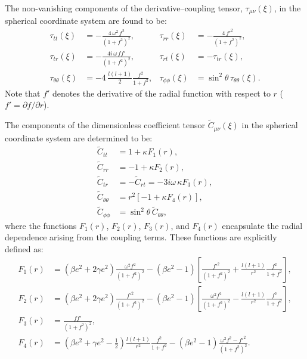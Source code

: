 \documentclass[aps,prd,superscriptaddress,notitlepage,11pt,final,longbibliography,nofootinbib]{revtex4-1}
\numberwithin{equation}{section}
\begin{document}
The non-vanishing components of the derivative--coupling tensor, $\tau_{\mu\nu}(\xi)$, in the spherical coordinate system are found to be:
\begin{align}
\tau_{tt}(\xi)&=-\frac{4\,\omega^2\,f^2}{(1+f^2)^2},
&\tau_{rr}(\xi)&=-\frac{4\,f'^2}{(1+f^2)^2},\nonumber\\
\tau_{tr}(\xi)&=-\frac{4i\,\omega\,ff'}{(1+f^2)^2},
&\tau_{rt}(\xi)&=-\tau_{tr}(\xi),\nonumber\\
\tau_{\theta\theta}(\xi)&=-4\,\frac{l(l+1)}{2}\frac{f^2}{1+f^2},
&\tau_{\phi\phi}(\xi)&=\sin^2\theta\,\tau_{\theta\theta}(\xi).\nonumber
\end{align}
Note that $f'$ denotes the derivative of the radial function with respect to $r$ ($f' = \partial f / \partial r$).

The components of the dimensionless coefficient tensor $\widetilde{C}_{\mu\nu}(\xi)$ in the spherical coordinate system are determined to be:
\begin{align}
\widetilde C_{tt}&=1+\kappa F_1(r),\nonumber\\ 
\widetilde C_{rr}&=-1+\kappa F_2(r),\nonumber\\
\widetilde C_{tr}&=-\widetilde C_{rt}=-3i\omega\,\kappa  F_3(r),\nonumber\\
\widetilde C_{\theta\theta}&=r^2[-1+\kappa F_4(r)],\nonumber\\
\widetilde C_{\phi\phi}&=\sin^2\theta \,\tilde C_{\theta\theta},\nonumber
\end{align}
where the functions $F_1(r)$, $F_2(r)$, $F_3(r)$, and $F_4(r)$ encapsulate the radial dependence arising from the coupling terms. These functions are explicitly defined as:
\begin{align}
F_1(r)&=(\beta e^2+2\gamma e^2)\frac{\omega^2f^2}{(1+f^2)^2}-(\beta e^2-1)\left[\frac{f'^2}{(1+f^2)^2}+\frac{l(l+1)}{r^2}\frac{f^2}{1+f^2}\right],\nonumber\\
F_2(r)&=(\beta e^2+2\gamma e^2)\frac{f'^2}{(1+f^2)^2}-(\beta e^2-1)\left[\frac{\omega^2 f^2}{(1+f^2)^2}-\frac{l(l+1)}{r^2}\frac{f^2}{1+f^2}\right],\nonumber\\
F_3(r)&=\frac{ff'}{(1+f^2)^2},\nonumber\\
F_4(r)&=(\beta e^2+\gamma e^2-{\textstyle\frac{1}{2}})\frac{l(l+1)}{r^2}\frac{f^2}{1+f^2}-(\beta e^2-1)\frac{\omega^2f^2-f'^2}{(1+f^2)^2}.\nonumber
\end{align}
\end{document}
